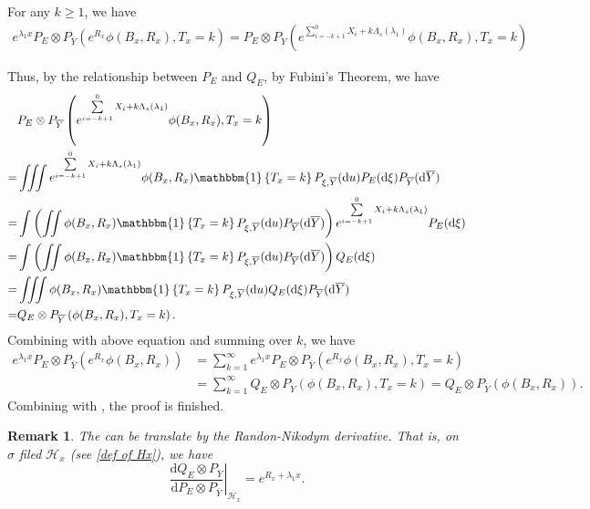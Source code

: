 \documentclass[]{article}
\makeatletter
\numberwithin{equation}{section}
\renewenvironment{proof}[1][\proofname]{%
	\par\pushQED{\qed}\normalfont%
	\topsep6\p@\@plus6\p@\relax
	\trivlist\item[\hskip\labelsep\bfseries#1\@addpunct{.}]%
	\ignorespaces
}{%
	\popQED\endtrivlist\@endpefalse
}
\theoremstyle{thmstyleone}%
\theoremstyle{thmstyletwo}%
\newtheorem{remark}{Remark}%
\theoremstyle{thmstylethree}%
\theoremstyle{thmstylefour}%
\theoremstyle{thmstylefive}%
\theoremstyle{thmstylesix}%
\renewcommand{\d}{\mathrm{d}}
\newcommand{\ind}[1]{\mathbbm{1}\left\{ #1\right\}}
\makeatother
\begin{document}
	\begin{proof}[Proof of \Cref{Measure change Relationship 1}]
		For any $k\geqslant1$, we have
		\begin{align*}
			e^{\lambda_1 x}P_E\otimes P_{\overline{Y}} \left(e^{R_x}\phi(B_x,R_x),T_x=k\right)
			=
			P_E\otimes P_{\overline{Y}}\left( e^{\sum\limits_{i=-k+1}^{0} X_i +k\Lambda_s(\lambda_1)}\phi(B_x,R_x),T_x=k \right)
		\end{align*}		
		
		Thus, by the relationship between $P_E$ and $Q_E$, by Fubini's Theorem, we have
		\begin{align*}
			&P_E\otimes P_{\overline{Y}}\left( e^{\sum\limits_{i=-k+1}^{0} X_i +k\Lambda_s(\lambda_1)}\phi(B_x,R_x),T_x=k \right)
			\\=&
			\iiint e^{\sum\limits_{i=-k+1}^{0} X_i +k\Lambda_s(\lambda_1)}\phi(B_x,R_x) \ind{T_x =k} P_{\xi,\overline{Y}}(\d u) P_E(\d \xi) P_{\overline{Y}} (\d \overline{Y})
			\\=&
			\int\left(\iint \phi(B_x,R_x) \ind{T_x=k} P_{\xi,\overline{Y}}(\d u) P_{\overline{Y}} (\d \overline{Y}) \right) e^{\sum\limits_{i=-k+1}^{0} X_i +k\Lambda_s(\lambda_1)}  P_E(\d \xi) 
			\\=&
			\int\left(\iint \phi(B_x,R_x) \ind{T_x=k} P_{\xi,\overline{Y}}(\d u) P_{\overline{Y}} (\d \overline{Y}) \right) Q_E(\d \xi) 
			\\
			=&
			\iiint \phi(B_x,R_x) \ind{T_x=k}  P_{\xi,\overline{Y}}(\d u) Q_E(\d \xi) P_{\overline{Y}} (\d \overline{Y})
			\\
			=&
			Q_E\otimes P_{\overline{Y}} \left(
			\phi(B_x,R_x),T_x=k
			\right).
		\end{align*}
		Combining with above equation and summing over $k$, we have
		\begin{align}
			e^{\lambda_1 x}P_E\otimes P_{\overline{Y}} \left(e^{R_x}\phi(B_x,R_x)\right)
			&=
			\sum_{k=1}^{\infty}e^{\lambda_1 x}P_E\otimes P_{\overline{Y}} \left(e^{R_x}\phi(B_x,R_x),T_x=k\right)
			\nonumber\\
			&=\sum_{k=1}^{\infty}
			Q_E\otimes P_{\overline{Y}} \left( \phi(B_x,R_x),T_x=k \right)
			=
			Q_E\otimes P_{\overline{Y}} \left( \phi(B_x,R_x)\right).\nonumber
		\end{align}
		Combining with , the proof is finished.
	\end{proof}
	
	\begin{remark}
		The  can be translate by the Randon-Nikodym derivative. That is, on $\sigma$ filed $\mathcal{H}_x$ (see \cref{def of Hx}), we have
		\begin{equation}
			\left.\frac{\d Q_E\otimes P_{\overline{Y}}}{\d P_E\otimes P_{\overline{Y}}} \right|_{\mathcal{H}_x}
			= e^{R_x+\lambda_1x}.
		\end{equation}
	\end{remark}
	
\end{document}
